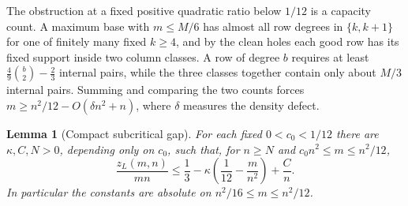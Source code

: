 \documentclass[11pt]{article}
\newtheorem{lemma}[theorem]{Lemma}
\newcommand{\zl}{z_L}
\begin{document}
The obstruction at a fixed positive quadratic ratio below $1/12$ is a
capacity count. A maximum base with $m\le M/6$ has almost all row degrees
in $\{k,k+1\}$ for one of finitely many fixed $k\ge4$, and by the clean holes each good row has its fixed support inside
two column classes. A row of degree $b$ requires at least $\frac49\binom b2-\frac23$
internal pairs, while the three classes together contain only about
$M/3$ internal pairs. Summing and comparing the two counts forces
$m\ge n^2/12-O(\delta n^2+n)$, where $\delta$ measures the density defect.

\begin{lemma}[Compact subcritical gap]\label{lem:linearcriticalgap}
\label{lem:compactsubcriticalgap}
For each fixed $0<c_0<1/12$ there are $\kappa,C,N>0$, depending only on
$c_0$, such that, for $n\ge N$ and $c_0n^2\le m\le n^2/12$,
\[
 \frac{\zl(m,n)}{mn}
 \le\frac13-\kappa\left(\frac1{12}-\frac m{n^2}\right)+\frac Cn.
\]
In particular the constants are absolute on $n^2/16\le m\le n^2/12$.
\end{lemma}
\end{document}
